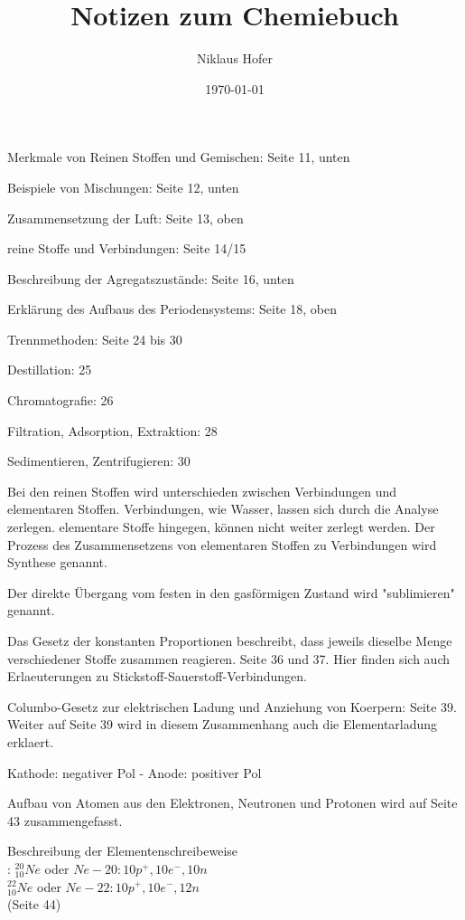 \documentclass[11pt,paper=a4,final]{scrartcl}
\title{Notizen zum Chemiebuch}
\author{Niklaus Hofer}
\date{\today{}}
\begin{document}

\begin{itemize*}
  \item Merkmale von Reinen Stoffen und Gemischen: Seite 11, unten
  \item Beispiele von Mischungen: Seite 12, unten
  \item Zusammensetzung der Luft: Seite 13, oben
  \item reine Stoffe und Verbindungen: Seite 14/15
  \item Beschreibung der Agregatszust\"ande: Seite 16, unten
  \item Erkl\"arung des Aufbaus des Periodensystems: Seite 18, oben
  \item Trennmethoden: Seite 24 bis 30
    \begin{itemize*}
      \item Destillation: 25
      \item Chromatografie: 26
      \item Filtration, Adsorption, Extraktion: 28
      \item Sedimentieren, Zentrifugieren: 30
    \end{itemize*}
\end{itemize*}

Bei den reinen Stoffen wird unterschieden zwischen Verbindungen und elementaren
Stoffen. Verbindungen, wie Wasser, lassen sich durch die Analyse zerlegen.
elementare Stoffe hingegen, k\"onnen nicht weiter zerlegt werden. Der Prozess
des Zusammensetzens von elementaren Stoffen zu Verbindungen wird Synthese
genannt. 

Der direkte \"Ubergang vom festen in den gasf\"ormigen Zustand wird
"sublimieren" genannt.

Das Gesetz der konstanten Proportionen beschreibt, dass jeweils dieselbe Menge
verschiedener Stoffe zusammen reagieren. Seite 36 und 37. Hier finden sich auch
Erlaeuterungen zu Stickstoff-Sauerstoff-Verbindungen.


Columbo-Gesetz zur elektrischen Ladung und Anziehung von Koerpern: Seite 39.
Weiter auf Seite 39 wird in diesem Zusammenhang auch die Elementarladung
erklaert.

Kathode: negativer Pol - Anode: positiver Pol

Aufbau von Atomen aus den Elektronen, Neutronen und Protonen wird auf Seite 43
zusammengefasst.

Beschreibung der Elementenschreibeweise\\: \(^{20}_{10}Ne\) oder \(Ne-20: 10p^+, 10e^-, 10n\)\\
                                         \(^{22}_{10}Ne\) oder \(Ne-22: 10p^+, 10e^-, 12n\)\\
					 (Seite 44)
\end{document}
